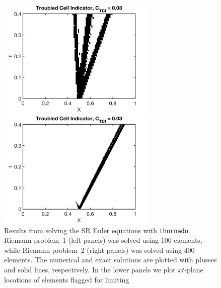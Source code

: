 \documentclass[letterpaper]{jpconf}
\newcommand{\thornado}{\texttt{thornado}}
\begin{document}
\begin{figure}[h]
\begin{minipage}{18pc}
    \includegraphics[width=18pc]{./Figures/MB2005_01_TCI_Astronum_2018}
  \end{minipage}\hspace{0.5pc}%
  \begin{minipage}{18pc}
    \includegraphics[width=18pc]{./Figures/MB2005_04_TCI_Astronum_2018}
  \end{minipage}
  \caption{\label{fig:RelativisticHydro}Results from solving the SR Euler equations with \thornado.  Riemann problem~1 (left panels) was solved using $100$ elements, while Riemann problem~2 (right panels) was solved using $400$ elements.  The numerical and exact solutions are plotted with plusses and solid lines, respectively.  In the lower panels we plot $xt$-plane locations of elements flagged for limiting}
\end{figure}
\end{document}
